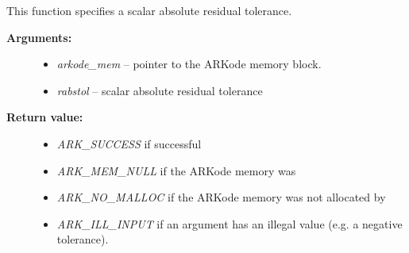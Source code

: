 \documentclass[letterpaper,10pt,english]{sphinxmanual}
\begin{document}
\begin{fulllineitems}
\label{c_interface/User_callable:ARKodeResStolerance}
This function specifies a scalar absolute residual tolerance.
\begin{description}
\item[{\textbf{Arguments:}}] \leavevmode\begin{itemize}
\item {} 
\emph{arkode\_mem} -- pointer to the ARKode memory block.

\item {} 
\emph{rabstol} -- scalar absolute residual tolerance

\end{itemize}

\item[{\textbf{Return value:}}] \leavevmode\begin{itemize}
\item {} 
\emph{ARK\_SUCCESS} if successful

\item {} 
\emph{ARK\_MEM\_NULL}  if the ARKode memory was 

\item {} 
\emph{ARK\_NO\_MALLOC}  if the ARKode memory was not allocated by {\hyperref[c_interface/User_callable:ARKodeInit]{}}

\item {} 
\emph{ARK\_ILL\_INPUT} if an argument has an illegal value (e.g. a negative tolerance).

\end{itemize}

\end{description}

\end{fulllineitems}

\end{document}
